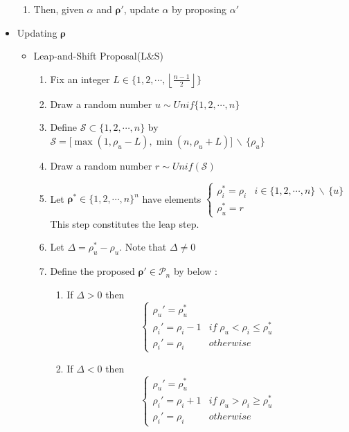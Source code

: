 \documentclass[12pt]{article}
\newcommand{\diff}{\,\backslash\,}
\newcommand{\floor}[1]{\left\lfloor #1 \right\rfloor}
\begin{document}
\begin{itemize}
\begin{enumerate}
        \item Then, given $\alpha$ and $\boldsymbol{\rho}'$, update $\alpha$ by proposing $\alpha'$
    \end{enumerate}
    \item Updating $\boldsymbol{\rho}$ 
    \begin{itemize}
        \item Leap-and-Shift Proposal(L\&S)
        \begin{enumerate}
            \item Fix an integer $L\in \{1,2,\cdots, \floor{\frac{n-1}{2}}\}$
            \item Draw a random number $u\sim Unif\{1,2,\cdots, n\}$
            \item Define $\mathcal{S}\subset \{1,2,\cdots, n\}$ by $\mathcal{S}=\big[\max (1, \rho_u-L), \min (n, \rho_u+L)\big]\diff\{\rho_u\}$
            \item Draw a random number $r\sim Unif(\mathcal{S})$
            \item Let $\boldsymbol{\rho}^*\in \{1,2,\cdots, n\}^n$ have elements $\begin{cases}
            \rho_i^*=\rho_i & i\in \{1,2,\cdots,n\}\diff \{u\} \\\rho_u^*=r \end{cases}$\\ This step constitutes the leap step.
            \item Let $\Delta=\rho_u^*-\rho_u$. Note that $\Delta\neq 0$ 
            \item Define the proposed $\boldsymbol{\rho}'\in \mathcal{P}_n$ by below :
            \begin{enumerate}
                \item If $\Delta>0$ then $$\begin{cases}
                    \rho_u'=\rho_u^* \\ \rho_i'=\rho_i-1 & if \; \rho_u<\rho_i\leq \rho_u^* \\ \rho_i'=\rho_i & otherwise
                \end{cases} $$
                \item If $\Delta<0$ then $$\begin{cases}
                    \rho_u'=\rho_u^* \\ \rho_i'=\rho_i+1 & if \; \rho_u>\rho_i\geq \rho_u^* \\ \rho_i'=\rho_i & otherwise
                \end{cases} $$
            \end{enumerate} 

\end{enumerate}
\end{itemize}
\end{itemize}
\end{document}
